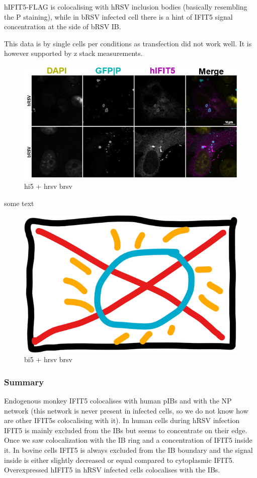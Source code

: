 hIFIT5-FLAG is colocalising with hRSV inclusion bodies (basically resembling the P staining), while in bRSV infected cell there is a hint of IFIT5 signal concentration at the side of bRSV IB.

This data is by single cells per conditions as transfection did not work well. It is however supported by z stack measurements.


\begin{figure}
    \centering
    \includegraphics[width=1\linewidth]{08. Chapter 3/Figs/05. IFIT5/05. hi5-hrsv-brsv.png}
    \caption[hi5 + hrsv brsv]{hi5 + hrsv brsv}
    \label{hi5 + hrsv brsv}
\end{figure}

some text

\begin{figure}
    \centering
    \includegraphics[width=0.5\linewidth]{06. Chapter 1//Figs/00. placeholder.png}
    \caption[bi5 + hrsv brsv]{bi5 + hrsv brsv}
    \label{bi5 + hrsv brsv}
\end{figure}

\subsubsection{Summary} \label{Summary}
Endogenous monkey IFIT5 colocalises with human pIBs and with the NP network (this network is never present in infected cells, so we do not know how are other IFIT5s colocalising with it). In human cells during hRSV infection IFIT5 is mainly excluded from the IBs but seems to concentrate on their edge. Once we saw colocalization with the IB ring and a concentration of IFIT5 inside it. In bovine cells IFIT5 is always excluded from the IB boundary and the signal inside is either slightly decreased or equal compared to cytoplasmic IFIT5. Overexpressed hIFIT5 in hRSV infected cells colocalises with the IBs.